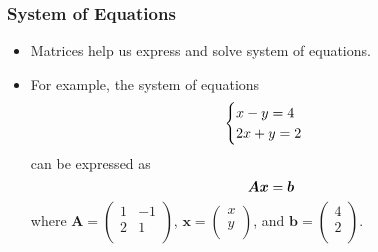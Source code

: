 \documentclass[pdflatex, 12pt]{beamer}
\begin{document}
\begin{frame}
\frametitle{System of Equations}
\begin{itemize}
\item Matrices help us express and solve system of equations.
\vspace{0.4cm}
\item For example, the system of equations
 \begin{eqnarray}
 \begin{cases}
 x - y = 4 \\
 2x + y = 2 \notag
 \end{cases}
 \end{eqnarray}
can be expressed as 
 \begin{equation}
 \bm{Ax} = \bm{b} \notag 
 \end{equation}
where $\bm{A} = \begin{pmatrix}
1 & -1 \\
2 & 1 \\
\end{pmatrix}$, $\bm{x} = \begin{pmatrix}
x \\
y \\
\end{pmatrix}$, and $\bm{b} = \begin{pmatrix}
4 \\
2 \\
\end{pmatrix}$.
\end{itemize}
\end{frame}
\end{document}
